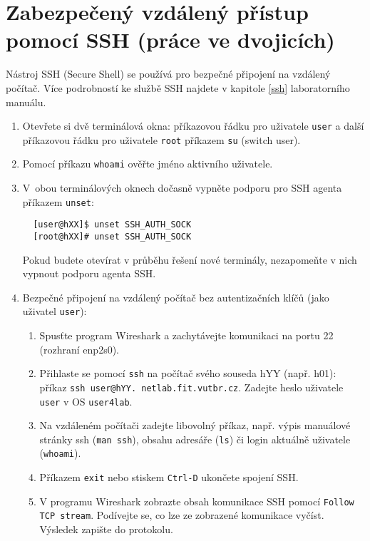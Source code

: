 \documentclass[a4paper,11pt]{article}
\begin{document}
\section{Zabezpečený vzdálený přístup pomocí SSH (práce ve dvojicích)}
Nástroj SSH (Secure Shell) se používá pro bezpečné připojení na vzdálený počítač. Více podrobností ke službě SSH najdete v kapitole \ref{ssh} laboratorního manuálu.
\begin{enumerate}
  \item Otevřete si dvě terminálová okna: příkazovou řádku pro uživatele {\tt user} a další
    příkazovou řádku pro uživatele {\tt root} příkazem {\tt su} (switch user).
  \item Pomocí příkazu {\tt whoami} ověřte jméno aktivního uživatele. 
  \item V~obou terminálových oknech dočasně vypněte podporu pro SSH agenta příkazem {\tt unset}:
  \begin{lstlisting}
  [user@hXX]$ unset SSH_AUTH_SOCK
  [root@hXX]# unset SSH_AUTH_SOCK
  \end{lstlisting}

  Pokud budete otevírat v průběhu řešení nové terminály, nezapomeňte v nich vypnout podporu agenta SSH.

  \item Bezpečné připojení na vzdálený počítač bez autentizačních klíčů (jako uživatel {\tt user}):
    \begin{enumerate}
      \item Spusťte program Wireshark a zachytávejte komunikaci na portu 22 (rozhraní enp2s0).
      \item Přihlaste se pomocí {\tt ssh} na počítač svého souseda hYY (např. h01): příkaz
        {\tt ssh user@hYY. netlab.fit.vutbr.cz}. Zadejte heslo uživatele {\tt user} v OS {\tt user4lab}.
      \item Na vzdáleném počítači zadejte libovolný příkaz, např. výpis manuálové stránky ssh ({\tt man ssh}), obsahu adresáře ({\tt ls}) či login aktuálně uživatele ({\tt whoami}).
      \item Příkazem {\tt exit} nebo stiskem {\tt Ctrl-D} ukončete spojení SSH.
      \item V programu Wireshark zobrazte obsah komunikace SSH pomocí {\tt Follow TCP stream}. Podí\-vej\-te se, co lze ze zobrazené komunikace vyčíst. Výsledek zapište do protokolu.
    \end{enumerate}


\end{enumerate}
\end{document}
